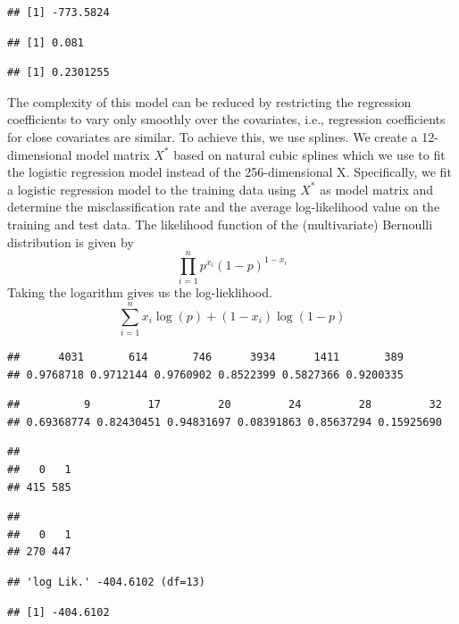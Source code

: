 \documentclass[
]{article}
\begin{document}
\begin{verbatim}
## [1] -773.5824
\end{verbatim}

\begin{verbatim}
## [1] 0.081
\end{verbatim}

\begin{verbatim}
## [1] 0.2301255
\end{verbatim}

The complexity of this model can be reduced by restricting the
regression coefficients to vary only smoothly over the covariates, i.e.,
regression coefficients for close covariates are similar. To achieve
this, we use splines. We create a 12-dimensional model matrix \(X^*\)
based on natural cubic splines which we use to fit the logistic
regression model instead of the 256-dimensional X. Specifically, we fit
a logistic regression model to the training data using \(X^*\) as model
matrix and determine the misclassification rate and the average
log-likelihood value on the training and test data. The likelihood
function of the (multivariate) Bernoulli distribution is given by
\[\prod_{i=1}^n p^{x_i}(1-p)^{1-x_i}\] Taking the logarithm gives us the
log-lieklihood. \[ \sum_{i=1}^n x_i \log(p)+(1-x_i)\log(1-p) \]

\begin{verbatim}
##      4031       614       746      3934      1411       389 
## 0.9768718 0.9712144 0.9760902 0.8522399 0.5827366 0.9200335
\end{verbatim}

\begin{verbatim}
##          9         17         20         24         28         32 
## 0.69368774 0.82430451 0.94831697 0.08391863 0.85637294 0.15925690
\end{verbatim}

\begin{verbatim}
## 
##   0   1 
## 415 585
\end{verbatim}

\begin{verbatim}
## 
##   0   1 
## 270 447
\end{verbatim}

\begin{verbatim}
## 'log Lik.' -404.6102 (df=13)
\end{verbatim}

\begin{verbatim}
## [1] -404.6102
\end{verbatim}
\end{document}
